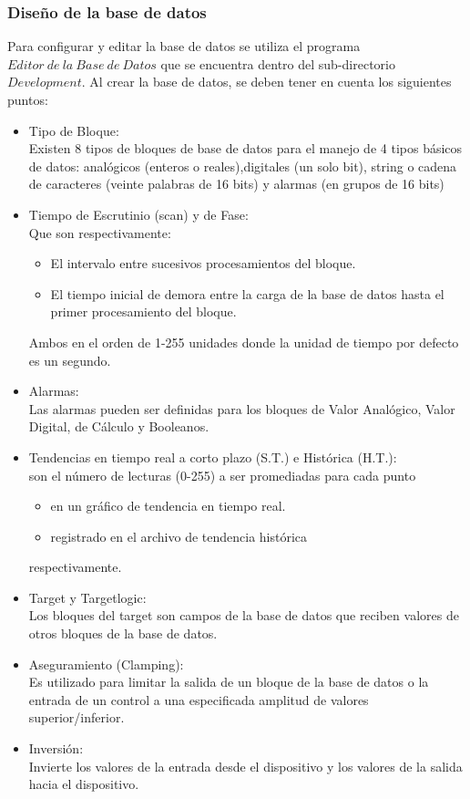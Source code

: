 \subsubsection{Diseño de la base de datos}
Para configurar y editar la base de datos se utiliza el programa 
$Editor~de~la~Base~de~Datos$ que se encuentra dentro del sub-directorio 
$Development$. Al crear la base de datos, se deben tener en cuenta los 
siguientes puntos:
\begin{itemize}
  \item Tipo de Bloque:\\Existen 8 tipos de bloques de base de datos para el
    manejo de 4 tipos básicos de datos: analógicos (enteros o reales),digitales 
    (un solo bit), string o cadena de caracteres (veinte palabras de 16 bits) y
    alarmas (en grupos de 16 bits)
  \item Tiempo de Escrutinio (scan) y de Fase:\\Que son respectivamente:
    \begin{itemize}
      \item El intervalo entre sucesivos procesamientos del bloque.
      \item El tiempo inicial de demora entre la carga de la base de datos 
      hasta el primer procesamiento del bloque.
    \end{itemize}
    Ambos en el orden de 1-255 unidades donde la unidad de tiempo por defecto es 
    un segundo.
  \item Alarmas:\\Las alarmas pueden ser definidas para los bloques de Valor 
    Analógico, Valor Digital, de Cálculo y Booleanos.
  \item Tendencias en tiempo real a corto plazo (S.T.) e Histórica (H.T.):\\son 
    el número de lecturas (0-255) a ser promediadas para cada punto 
    \begin{itemize}
      \item en un gráfico de tendencia en tiempo real.
      \item registrado en el archivo de tendencia histórica
    \end{itemize}
    respectivamente.
  \item Target y Targetlogic:\\Los bloques del target son campos de la base de 
    datos que reciben valores de otros bloques de la base de datos.
  \item Aseguramiento (Clamping):\\Es utilizado para limitar la salida de un 
    bloque de la base de datos o la entrada de un control a una especificada 
    amplitud de valores superior/inferior.
  \item Inversión:\\ Invierte los valores de la entrada desde el dispositivo y 
    los valores de la salida hacia el dispositivo.
\end{itemize}

